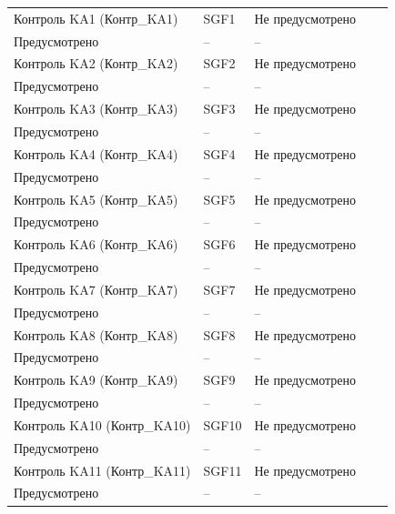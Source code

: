 \begin{longtable}{|>{\centering\arraybackslash}m{5.3cm}|>{\centering\arraybackslash}m{3.3cm}|>{\centering\arraybackslash}m{4.2cm}|>{\centering\arraybackslash}m{1.8cm}|>{\centering\arraybackslash}m{1cm}|}
\hline
\multicolumn{5}{|c|}{ ОБР ЗН } \\ \hline 
\centering Контроль KA1 (Контр\_KA1)  & \centering SGF1 & \centering Не предусмотрено \\ Предусмотрено & \centering -- & \centering \arraybackslash -- \\
\hline
\centering Контроль KA2 (Контр\_KA2)  & \centering SGF2 & \centering Не предусмотрено \\ Предусмотрено & \centering -- & \centering \arraybackslash -- \\
\hline
\centering Контроль KA3 (Контр\_KA3)  & \centering SGF3 & \centering Не предусмотрено \\ Предусмотрено & \centering -- & \centering \arraybackslash -- \\
\hline
\centering Контроль KA4 (Контр\_KA4)  & \centering SGF4 & \centering Не предусмотрено \\ Предусмотрено & \centering -- & \centering \arraybackslash -- \\
\hline
\centering Контроль KA5 (Контр\_KA5)  & \centering SGF5 & \centering Не предусмотрено \\ Предусмотрено & \centering -- & \centering \arraybackslash -- \\
\hline
\centering Контроль KA6 (Контр\_KA6)  & \centering SGF6 & \centering Не предусмотрено \\ Предусмотрено & \centering -- & \centering \arraybackslash -- \\
\hline
\centering Контроль KA7 (Контр\_KA7)  & \centering SGF7 & \centering Не предусмотрено \\ Предусмотрено & \centering -- & \centering \arraybackslash -- \\
\hline
\centering Контроль KA8 (Контр\_KA8)  & \centering SGF8 & \centering Не предусмотрено \\ Предусмотрено & \centering -- & \centering \arraybackslash -- \\
\hline
\centering Контроль KA9 (Контр\_KA9)  & \centering SGF9 & \centering Не предусмотрено \\ Предусмотрено & \centering -- & \centering \arraybackslash -- \\
\hline
\centering Контроль KA10 (Контр\_KA10)  & \centering SGF10 & \centering Не предусмотрено \\ Предусмотрено & \centering -- & \centering \arraybackslash -- \\
\hline
\centering Контроль KA11 (Контр\_KA11)  & \centering SGF11 & \centering Не предусмотрено \\ Предусмотрено & \centering -- & \centering \arraybackslash -- \\

\end{longtable}
